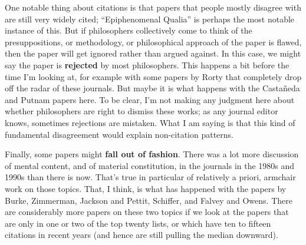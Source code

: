 \documentclass[
  10pt,
  letterpaper,
  DIV=11,
  numbers=noendperiod,
  twoside]{scrartcl}
\begin{document}
One notable thing about citations is that papers that people mostly
disagree with are still very widely cited; ``Epiphenomenal Qualia'' is
perhaps the most notable instance of this. But if philosophers
collectively come to think of the presuppositions, or methodology, or
philosophical approach of the paper is flawed, then the paper will get
ignored rather than argued against. In this case, we might say the paper
is \textbf{rejected} by most philosophers. This happens a bit before the
time I'm looking at, for example with some papers by Rorty that
completely drop off the radar of these journals. But maybe it is what
happens with the Castañeda and Putnam papers here. To be clear, I'm not
making any judgment here about whether philosophers are right to dismiss
these works; as any journal editor knows, sometimes rejections are
mistaken. What I am saying is that this kind of fundamental disagreement
would explain non-citation patterns.

Finally, some papers might \textbf{fall out of fashion}. There was a lot
more discussion of mental content, and of material constitution, in the
journals in the 1980s and 1990s than there is now. That's true in
particular of relatively a priori, armchair work on those topics. That,
I think, is what has happened with the papers by Burke, Zimmerman,
Jackson and Pettit, Schiffer, and Falvey and Owens. There are
considerably more papers on these two topics if we look at the papers
that are only in one or two of the top twenty lists, or which have ten
to fifteen citations in recent years (and hence are still pulling the
median downward).
\end{document}
